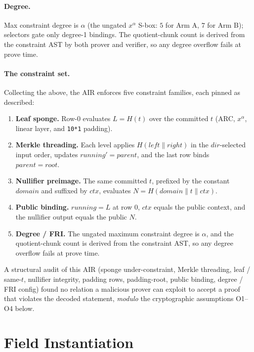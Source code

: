 \documentclass[11pt]{article}
\newcommand{\cat}{\mathbin{\|}}          %
\theoremstyle{plain}
\theoremstyle{definition}
\begin{document}
\paragraph{Degree.} Max constraint degree is $\alpha$ (the ungated $x^\alpha$ S-box: $5$ for Arm A, $7$ for Arm B); selectors gate only
degree-1 bindings. The quotient-chunk count is derived from the constraint AST by both prover and
verifier, so any degree overflow fails at prove time.

\paragraph{The constraint set.} Collecting the above, the AIR enforces five constraint families, each
pinned as described:
\begin{enumerate}[leftmargin=*,label=\textbf{C\arabic*.}]
\item \textbf{Leaf sponge.} Row-0 evaluates $L = H(t)$ over the committed $t$ (ARC, $x^\alpha$, linear
  layer, and \texttt{10*1} padding).
\item \textbf{Merkle threading.} Each level applies $H(\mathit{left} \cat \mathit{right})$ in the
  $\mathit{dir}$-selected input order, updates $\mathit{running}' = \mathit{parent}$, and the last row
  binds $\mathit{parent} = \mathit{root}$.
\item \textbf{Nullifier preimage.} The same committed $t$, prefixed by the constant $\mathit{domain}$
  and suffixed by $\mathit{ctx}$, evaluates $N = H(\mathit{domain} \cat t \cat \mathit{ctx})$.
\item \textbf{Public binding.} $\mathit{running} = L$ at row 0, $\mathit{ctx}$ equals the public
  context, and the nullifier output equals the public $N$.
\item \textbf{Degree / FRI.} The ungated maximum constraint degree is $\alpha$, and the
  quotient-chunk count is derived from the constraint AST, so any degree overflow fails at prove time.
\end{enumerate}

A structural audit of this AIR (sponge under-constraint, Merkle threading, leaf / same-$t$, nullifier
integrity, padding rows, padding-root, public binding, degree / FRI config) found no relation a
malicious prover can exploit to accept a proof that violates the decoded statement, \emph{modulo} the
cryptographic assumptions O1--O4 below.

\section{Field Instantiation}
\end{document}
